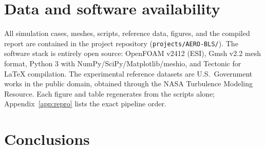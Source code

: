 \documentclass[11pt,a4paper]{article}
\begin{document}
\section{Data and software availability}
All simulation cases, meshes, scripts, reference data, figures, and the compiled report are contained in the project repository (\texttt{projects/AERO-BLS/}). The software stack is entirely open source: OpenFOAM v2412 (ESI), Gmsh v2.2 mesh format, Python 3 with NumPy/SciPy/Matplotlib/meshio, and Tectonic for \LaTeX{} compilation. The experimental reference datasets are U.S.\ Government works in the public domain, obtained through the NASA Turbulence Modeling Resource. Each figure and table regenerates from the scripts alone; Appendix~\ref{app:repro} lists the exact pipeline order.

\section{Conclusions}
\end{document}
